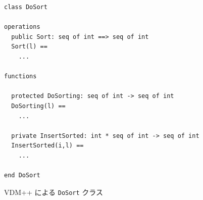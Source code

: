 \documentclass[\pformat,11pt]{jarticle}
\begin{document}
\begin{figure}[h]
\begin{center}
\begin{small}
\begin{screen}
\begin{verbatim}  
class DoSort

operations
  public Sort: seq of int ==> seq of int
  Sort(l) ==
    ...

functions

  protected DoSorting: seq of int -> seq of int
  DoSorting(l) ==
    ...

  private InsertSorted: int * seq of int -> seq of int
  InsertSorted(i,l) ==
    ...

end DoSort
\end{verbatim}
\end{screen}
\end{small}
\caption{VDM++ による {\tt DoSort} クラス}\label{fig:doSortVDM}
\end{center}
\end{figure}

\newpage
\end{document}
